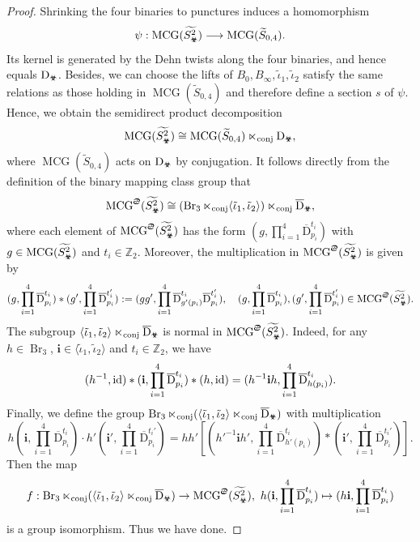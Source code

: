 \documentclass[11pt,a4paper,reqno]{amsart}%
\theoremstyle{plain}
\theoremstyle{definition}
\numberwithin{equation}{section}
\numberwithin{equation}{section}
\def\ZZ{\mathbb{Z}}
\def\x{_\vot}
\newcommand{\MCG}{\operatorname{MCG}}
\def\Br{\operatorname{Br}}
\def\vot{\text{\Biohazard}}
\def\sx{\text{\Cancer}}
\begin{document}
 \begin{proof}
 Shrinking the four binaries to punctures induces a homomorphism
\[
\psi:\MCG(\widetilde{S\x^2})\longrightarrow
\MCG(\widetilde{S}_{0,4}).
\]
Its kernel is generated by the Dehn twists along the four binaries, and hence equals $\mathrm D_{\vot}$. Besides, we can choose the lifts of
$B_0,B_\infty,\widetilde\iota_1,\widetilde\iota_2$ satisfy the same relations as  those holding in $\MCG(\widetilde S_{0,4})$ and therefore define a section $s$ of $\psi$.  Hence, we obtain the semidirect product decomposition
\[
\MCG(\widetilde{S\x^2})
\cong\MCG(\widetilde S_{0,4})\ltimes_{\rm conj}\mathrm D_{\vot},
\]
where $\MCG(\widetilde{S}_{0,4})$ acts on $\mathrm{D}_{\vot}$ by conjugation.
It follows directly from the definition of the  binary mapping class group that
\[
\MCG^\sx(\widetilde{S\x^2} )\cong 
    (\Br_3\ltimes_{\rm conj}\langle\tilde\iota_1,\tilde\iota_2\rangle)\ltimes_{\rm conj}\overline{\mathrm{D}}_{\vot},
\] where each element of 
 $\MCG^\sx(\widetilde{S\x^2})$ has the form $(g,\prod_{i=1}^4 \overline{\mathrm{D}}_{p_i}^{t_i})$ with $g \in \MCG (\widetilde{S\x^2})$ and $t_i\in \ZZ_2$. Moreover,  the multiplication in $\MCG^\sx(\widetilde{S\x^2})$ is given by  
 \[
(g, \prod_{i=1}^4 \overline{\mathrm{D}}_{p_i}^{t_i}) * (g', \prod_{i=1}^4 \overline{\mathrm{D}}_{p_i}^{t_i'}) := (g g', \prod_{i=1}^4 \overline{\mathrm{D}}_{g'(p_i)}^{t_i}   \overline{\mathrm{D}}_{ p_i }^{t_i'} )  , \quad (g, \prod_{i=1}^4 \overline{\mathrm{D}}_{p_i}^{t_i}),(g', \prod_{i=1}^4 \overline{\mathrm{D}}_{p_i}^{t_i'})\in\MCG^\sx(\widetilde{S\x^2}). 
\]
The subgroup
$\langle\tilde\iota_1,\tilde\iota_2\rangle\ltimes_{\rm conj}\overline{\mathrm{D}}_{\vot}$
is normal in $\MCG^\sx(\widetilde{S\x^2})$.
Indeed, for any $h\in \Br_3$, $\mathbf{i}\in\langle\tilde\iota_1,\tilde\iota_2\rangle$ and $ t_i  \in \ZZ_2$,    we have 
\[
(h^{-1},  {\rm id}) * (\mathbf{i},\prod_{i=1}^4 \overline{\mathrm{D}}_{p_i}^{t_i})*(h ,  {\rm id}) =(h^{-1}\mathbf{i}h,\prod_{i=1}^4 \overline{\mathrm{D}}_{h(p_i)}^{t_i}).
\]
Finally, we define the group $ \Br_3\ltimes_{\rm conj}(\langle\tilde\iota_1,\tilde\iota_2\rangle \ltimes_{\rm conj}\overline{\mathrm{D}}_{\vot})$ with multiplication
\[
h(\mathbf{i},\prod_{i=1}^4 \overline{\mathrm{D}}_{p_i}^{t_i})\cdot h'(\mathbf{i}',\prod_{i=1}^4 \overline{\mathrm{D}}_{p_i}^{t_i'})=hh'[({h'}^{-1}\mathbf{i}{h'}, \prod_{i=1}^4 \overline{\mathrm{D}}_{h'(p_i)}^{t_i} )*(\mathbf{i}',\prod_{i=1}^4 \overline{\mathrm{D}}_{p_i}^{t_i'})].%
\]
 Then    the map
\[  f:  \Br_3\ltimes_{\rm conj}(\langle\tilde\iota_1,\tilde\iota_2\rangle \ltimes_{\rm conj}\overline{\mathrm{D}}_{\vot})\to\MCG^\sx(\widetilde{S\x^2}) ,\ h(\mathbf{i}, \prod_{i=1}^4 \overline{\mathrm{D}}_{ p_i}^{t_i})  \mapsto
(h\mathbf{i}, \prod_{i=1}^4 \overline{\mathrm{D}}_{ p_i}^{t_i})
\] is a group isomorphism. Thus we have done.
 \end{proof}
\end{document}
